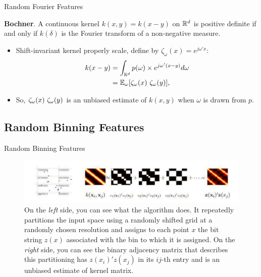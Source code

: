 \documentclass[unknownkeysallowed]{beamer}
\begin{document}
\begin{frame}{Random Fourier Features}

\begin{theorem}
\textbf{Bochner}. A continuous kernel $k(x,y) = k(x - y)$ on $\mathbb{R}^d$ is positive definite if and only if $k(\delta)$ is the Fourier transform of a non-negative measure.
\end{theorem}
\begin{itemize}
    \item Shift-invariant kernel properly scale, define by $\zeta_{\omega}(x) = e^{j\omega'x}$:
\begin{align*}
k(x-y) &= \int_{\bbR^d} p(\omega) \times e^{j\omega'(x-y)}d\omega \\
           &= \bbE_{\omega}[\zeta_{\omega}(x) \ \zeta_{\omega}(y)\*],
\end{align*}
   \item So,  $\zeta_{\omega}(x) \ \zeta_{\omega}(y)\*$ is an unbiased estimate of $k(x,y)$ when $\omega$ is drawn from $p$.
\end{itemize}
\end{frame}


\subsection{Random Binning Features}
\label{sub:Random Binning Features}

\begin{frame}{Random Binning Features}

\begin{figure}[h!]
    \centering
    \includegraphics[scale=0.6]{images/Radom_binning_features.pdf}
    \caption{On the \textit{left} side, you can see what the algorithm does. It repeatedly partitions the input space using a randomly shifted grid at a randomly chosen resolution and assigns to each point $x$ the bit string $z(x)$ associated with the bin to which it is assigned. On the \textit{right} side, you can see the binary adjacency matrix that describes this partitioning has $z(x_i)'z(x_j)$ in its $ij$-th entry and is an unbiased estimate of kernel matrix.}
    \label{Random_shift_grids}
\end{figure}


\end{frame}
\end{document}

